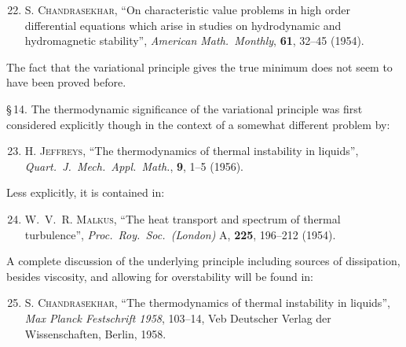 \begin{enumerate}
\setcounter{enumi}{21}

\item S. \textsc{Chandrasekhar}, ``On characteristic value problems in high order
  differential equations which arise in studies on hydrodynamic and hydromagnetic
  stability'', \textit{American Math.\ Monthly}, \textbf{61}, 32--45 (1954).

\end{enumerate}

\noindent The fact that the variational principle gives the true minimum does not seem to
have been proved before.

\noindent \S\,14. The thermodynamic significance of the variational principle was first
considered explicitly though in the context of a somewhat different problem by:

\begin{enumerate}
\setcounter{enumi}{22}

\item H. \textsc{Jeffreys}, ``The thermodynamics of thermal instability in liquids'',
  \textit{Quart.\ J.\ Mech.\ Appl.\ Math.}, \textbf{9}, 1--5 (1956).

\end{enumerate}

\noindent Less explicitly, it is contained in:

\begin{enumerate}
\setcounter{enumi}{23}

\item W.~V.~R. \textsc{Malkus}, ``The heat transport and spectrum of thermal turbulence'',
  \textit{Proc.\ Roy.\ Soc.\ (London)} A, \textbf{225}, 196--212 (1954).

\end{enumerate}

\noindent A complete discussion of the underlying principle including sources of dissipation,
besides viscosity, and allowing for overstability will be found in:

\begin{enumerate}
\setcounter{enumi}{24}

\item S. \textsc{Chandrasekhar}, ``The thermodynamics of thermal instability in liquids'',
  \textit{Max Planck Festschrift 1958}, 103--14, Veb Deutscher Verlag der Wissenschaften,
  Berlin, 1958.

\end{enumerate}

